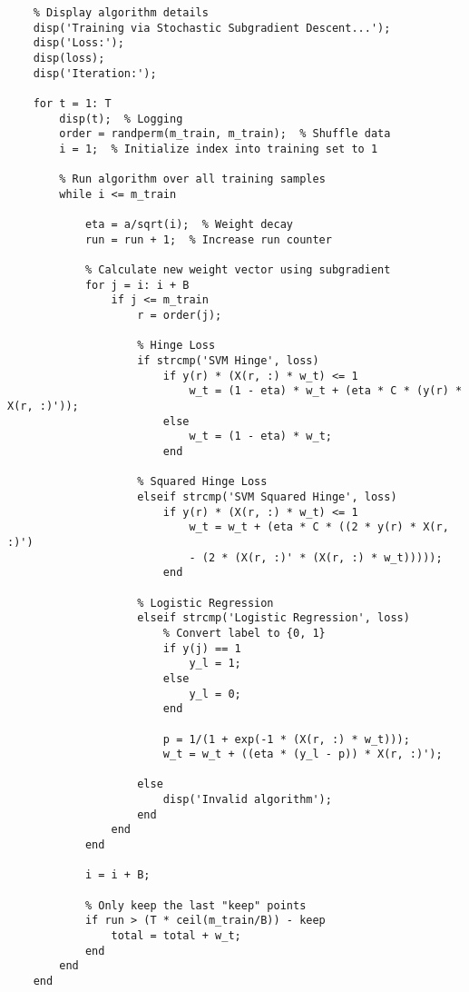 \documentclass[11pt, oneside]{article}   	%
\begin{document}
\begin{verbatim}
    % Display algorithm details
    disp('Training via Stochastic Subgradient Descent...');
    disp('Loss:');
    disp(loss);
    disp('Iteration:');

    for t = 1: T 
        disp(t);  % Logging
        order = randperm(m_train, m_train);  % Shuffle data
        i = 1;  % Initialize index into training set to 1
        
        % Run algorithm over all training samples
        while i <= m_train
            
            eta = a/sqrt(i);  % Weight decay
            run = run + 1;  % Increase run counter
            
            % Calculate new weight vector using subgradient
            for j = i: i + B
                if j <= m_train                
                    r = order(j);
                    
                    % Hinge Loss
                    if strcmp('SVM Hinge', loss)
                        if y(r) * (X(r, :) * w_t) <= 1
                            w_t = (1 - eta) * w_t + (eta * C * (y(r) * X(r, :)'));
                        else
                            w_t = (1 - eta) * w_t;
                        end
                    
                    % Squared Hinge Loss
                    elseif strcmp('SVM Squared Hinge', loss)
                        if y(r) * (X(r, :) * w_t) <= 1
                            w_t = w_t + (eta * C * ((2 * y(r) * X(r, :)') 
                            - (2 * (X(r, :)' * (X(r, :) * w_t)))));
                        end
                    
                    % Logistic Regression
                    elseif strcmp('Logistic Regression', loss)
                        % Convert label to {0, 1}
                        if y(j) == 1
                            y_l = 1;
                        else
                            y_l = 0;
                        end

                        p = 1/(1 + exp(-1 * (X(r, :) * w_t)));
                        w_t = w_t + ((eta * (y_l - p)) * X(r, :)');
                    
                    else
                        disp('Invalid algorithm');
                    end
                end
            end
            
            i = i + B;
            
            % Only keep the last "keep" points
            if run > (T * ceil(m_train/B)) - keep
                total = total + w_t;
            end
        end
    end
    

\end{verbatim}
\end{document}
